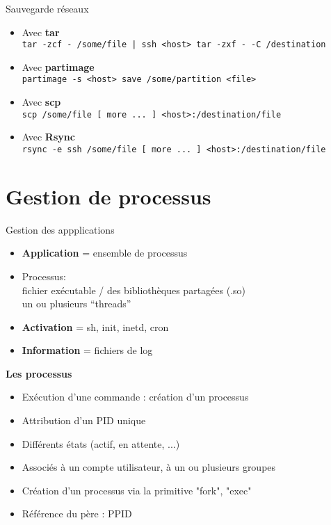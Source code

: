 \documentclass[french]{beamer}
\begin{document}
\begin{frame}
Sauvegarde réseaux
\begin{itemize}
\item Avec \textbf{tar}\\
\texttt{tar -zcf - /some/file | ssh <host> tar -zxf - -C /destination}
\item Avec \textbf{partimage}\\
\texttt{partimage -s <host> save /some/partition <file>}
\item Avec \textbf{scp}\\
\texttt{scp /some/file [\ more ... ]\ <host>:/destination/file}
\item Avec \textbf{Rsync}\\
\texttt{rsync -e ssh /some/file [\ more ... ]\
<host>:/destination/file}

\end{itemize}
\end{frame}


\section{Gestion de processus} 
\frame{\tableofcontents[current]}

\begin{frame}
Gestion des appplications
\begin{itemize}
\item \textbf{Application} = ensemble de processus
\item Processus:\\
fichier exécutable / des bibliothèques partagées (.so) \\
un ou plusieurs “threads”
\item \textbf{Activation} = sh, init, inetd, cron
\item \textbf{Information} = fichiers de log
\end{itemize}
\end{frame}


\begin{frame}
\textbf{Les processus}
\begin{itemize}
\item Exécution d'une commande : création d'un processus
\item Attribution d'un PID unique
\item Différents états (actif, en attente, ...)
\item Associés à un compte utilisateur, à un ou plusieurs groupes
\item Création d'un processus via la primitive "fork", "exec"
\item Référence du père : PPID

\end{itemize}
\end{frame}
\end{document}
